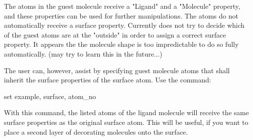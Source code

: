 The atoms in the guest molecule receive a "Ligand" and a "Molecule" 
property, and these properties can be used for further manipulations.
The atoms do not automatically receive a surface property.
Currently \Discus does not try to decide which of the guest atoms are
at the "outside" in order to assign a correct surface property. It
appears the the molecule shape is too impredictable to do so fully
automatically. (\Discus may try to learn this in the future...)

The user can, however, assist by specifying guest molecule atoms 
that shall inherit the surface properties of the surface atom.
Use the command:

\begin{MacVerbatim}
set example, surface, atom_no
\end{MacVerbatim}
With this command, the listed atoms of the ligand molecule will 
receive the same surface properties as the original surface atom.
This will be useful, if you want to place a second layer of decorating 
molecules onto the surface.
